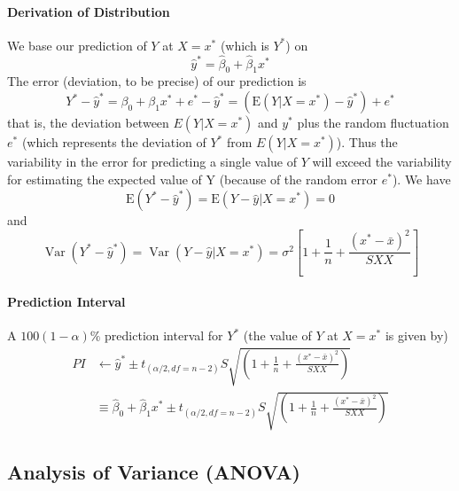 \documentclass[10pt]{article}
\begin{document}
\paragraph{Derivation of Distribution}
We base our prediction of $Y$ at $X = x^*$ (which is $Y^*$) on
\begin{equation*}
    \hat{y}^{*}=\hat{\beta}_{0}+\hat{\beta}_{1} x^{*}
\end{equation*}
The error (deviation, to be precise) of our prediction is 
\begin{equation*}
    Y^{*}-\hat{y}^{*}=\beta_{0}+\beta_{1} x^{*}+e^{*}-\hat{y}^{*}= \left(\mathrm{E}\left(Y | X=x^{*}\right)- \hat{y}^{*} \right) + e^{*}
\end{equation*}
that is, the deviation between $E(Y | X = x^*)$ and $y^*$ plus the random fluctuation $e^*$ (which represents the deviation of $Y^*$ from $E(Y|X = x^*)$). Thus the variability in the error for predicting a single value of $Y$ will exceed the variability for estimating the expected value of Y (because of the random error $e^*$). We have
\begin{equation*}
    \mathrm{E}\left(Y^{*}-\hat{y}^{*}\right)=\mathrm{E}\left(Y-\hat{y} | X=x^{*}\right)=0
\end{equation*}
and
\begin{equation*}
    \operatorname{Var}\left(Y^{*}-\hat{y}^{*}\right)=\operatorname{Var}\left(Y-\hat{y} | X=x^{*}\right)=\sigma^{2}\left[1+\frac{1}{n}+\frac{\left(x^{*}-\bar{x}\right)^{2}}{S X X}\right]
\end{equation*}

\paragraph{Prediction Interval}
A $100 (1 - \alpha)\%$ prediction interval for $Y^*$ (the value of $Y$  at $X = x^*$ is given by)
\begin{align*}
    PI &\gets \hat{y}^{*} \pm t_{(\alpha / 2, df = n-2)} S \sqrt{\left(1+\frac{1}{n}+\frac{\left(x^{*}-\bar{x}\right)^{2}}{S X X}\right)} \\
    &\equiv \hat{\beta}_{0}+\hat{\beta}_{1} x^{*} \pm t_{(\alpha / 2, df = n-2)} S \sqrt{\left(1+\frac{1}{n}+\frac{\left(x^{*}-\bar{x}\right)^{2}}{S X X}\right)}
\end{align*}

\subsection{Analysis of Variance (ANOVA)}
\end{document}
